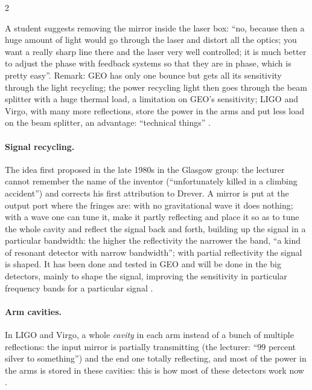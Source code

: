 \begin{paracol}{2}
\begin{coursenote}
A student suggests removing the mirror inside the laser box: ``no, because then a huge amount of light would go through the laser and distort all the optics; you want a really sharp line there and the laser very well controlled; it is much better to adjust the phase with feedback systems so that they are in phase, which is pretty easy''. Remark: GEO has only one bounce but gets all its sensitivity through the light recycling; the power recycling light then goes through the beam splitter with a huge thermal load, a limitation on GEO's sensitivity; LIGO and Virgo, with many more reflections, store the power in the arms and put less load on the beam splitter, an advantage: ``technical things'' .
\end{coursenote}

\paragraph{Signal recycling.} The idea first proposed in the late 1980s in the Glasgow group: the lecturer cannot remember the name of the inventor (``unfortunately killed in a climbing accident'') and corrects his first attribution to Drever. A mirror is put at the output port where the fringes are: with no gravitational wave it does nothing; with a wave one can tune it, make it partly reflecting and place it so as to tune the whole cavity and reflect the signal back and forth, building up the signal in a particular bandwidth: the higher the reflectivity the narrower the band, ``a kind of resonant detector with narrow bandwidth''; with partial reflectivity the signal is shaped. It has been done and tested in GEO and will be done in the big detectors, mainly to shape the signal, improving the sensitivity in particular frequency bands for a particular signal .

\paragraph{Arm cavities.} In LIGO and Virgo, a whole \emph{cavity} in each arm instead of a bunch of multiple reflections: the input mirror is partially transmitting (the lecturer: ``$99$ percent silver to something'') and the end one totally reflecting, and most of the power in the arms is stored in these cavities: this is how most of these detectors work now .


\end{paracol}

